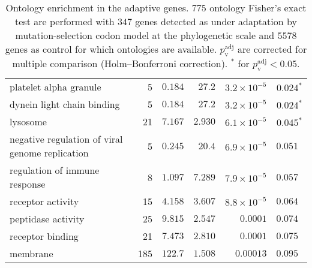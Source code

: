 \documentclass{article}
\begin{document}
\begin{table*}[!ht]
\begin{adjustbox}{width = 1\textwidth}
\begin{tabular}{|l|r|r|r|r|r|}
                platelet alpha granule                            & 5   & $ 0.184$ & $  27.2$   & $3.2\times 10^{-5}$  & $\bm{ 0.024{^*}}$             \\
                dynein light chain binding                        & 5   & $ 0.184$ & $  27.2$   & $3.2\times 10^{-5}$  & $\bm{ 0.024{^*}}$             \\
                lysosome                                          & 21  & $ 7.167$ & $ 2.930$ & $6.1\times 10^{-5}$  & $\bm{ 0.045{^*}}$             \\
                negative regulation of viral genome replication   & 5   & $ 0.245$ & $  20.4$   & $6.9\times 10^{-5}$ & $ 0.051~~$ \\
                regulation of immune response                     & 8   & $ 1.097$ & $ 7.289$ & $7.9\times 10^{-5}$  & $ 0.057~~$                    \\
                receptor activity                                 & 15  & $ 4.158$ & $ 3.607$ & $8.8\times 10^{-5}$  & $ 0.064~~$                    \\
                peptidase activity                                & 25  & $ 9.815$ & $ 2.547$ & $0.0001$             & $ 0.074~~$                    \\
                receptor binding                                  & 21  & $ 7.473$ & $ 2.810$ & $0.0001$             & $ 0.075~~$                    \\
                membrane                                          & 185 & $ 122.7$ & $ 1.508$ & $0.00013$            & $ 0.095~~$                    \\
                \bottomrule
            \end{tabular}
        \end{adjustbox}
        \caption{
            Ontology enrichment in the adaptive genes.
            $775$ ontology Fisher's exact test are performed with $347$ genes detected as under adaptation by mutation-selection codon model at the phylogenetic scale and $5578$ genes as control for which ontologies are available.
            $p_{\mathrm{v}}^{\mathrm{adj}}$ are corrected for multiple comparison (Holm–Bonferroni correction).
            $^*$ for $p_{\mathrm{v}}^{\mathrm{adj}} < 0.05$.
        }
        \label{table:ontology}
    \end{table*}
\end{document}
